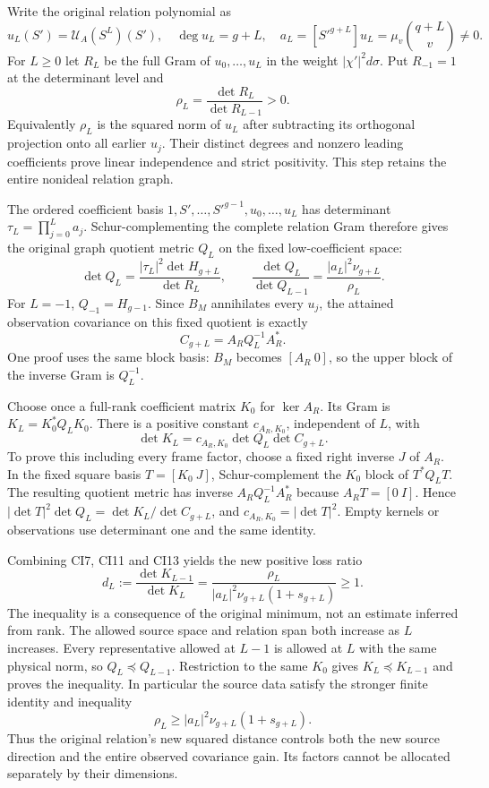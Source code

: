 \documentclass[11pt]{article}
\begin{document}
Write the original relation polynomial as \[
u_L(S')=\mathcal U_A(S^L)(S'),\quad \deg u_L=g+L,
\quad a_L=[S'^{g+L}]u_L=\mu_v\binom{q+L}{v}\ne0.
\tag{CI9}
\] For \(L\ge0\) let \(R_L\) be the full Gram of \(u_0,\ldots,u_L\) in the weight \(|\chi'|^2d\sigma\). Put \(R_{-1}=1\) at the determinant level and \[
\rho_L=\frac{\det R_L}{\det R_{L-1}}>0.
\tag{CI10}
\] Equivalently \(\rho_L\) is the squared norm of \(u_L\) after subtracting its orthogonal projection onto all earlier \(u_j\). Their distinct degrees and nonzero leading coefficients prove linear independence and strict positivity. This step retains the entire nonideal relation graph.

The ordered coefficient basis \(1,S',\ldots,S'^{g-1},u_0,\ldots,u_L\) has determinant \(\tau_L=\prod_{j=0}^La_j\). Schur-complementing the complete relation Gram therefore gives the original graph quotient metric \(Q_L\) on the fixed low-coefficient space: \[
\det Q_L=\frac{|\tau_L|^2\det H_{g+L}}{\det R_L},
\qquad
\frac{\det Q_L}{\det Q_{L-1}}
=\frac{|a_L|^2\nu_{g+L}}{\rho_L}.
\tag{CI11}
\] For \(L=-1\), \(Q_{-1}=H_{g-1}\). Since \(B_M\) annihilates every \(u_j\), the attained observation covariance on this fixed quotient is exactly \[
C_{g+L}=A_RQ_L^{-1}A_R^*.
\tag{CI12}
\] One proof uses the same block basis: \(B_M\) becomes \([A_R\ 0]\), so the upper block of the inverse Gram is \(Q_L^{-1}\).

Choose once a full-rank coefficient matrix \(K_0\) for \(\ker A_R\). Its Gram is \(K_L=K_0^*Q_LK_0\). There is a positive constant \(c_{A_R,K_0}\), independent of \(L\), with \[
\det K_L=c_{A_R,K_0}\det Q_L\det C_{g+L}.
\tag{CI13}
\] To prove this including every frame factor, choose a fixed right inverse \(J\) of \(A_R\). In the fixed square basis \(T=[K_0\ J]\), Schur-complement the \(K_0\) block of \(T^*Q_LT\). The resulting quotient metric has inverse \(A_RQ_L^{-1}A_R^*\) because \(A_RT=[0\ I]\). Hence \(|\det T|^2\det Q_L=\det K_L/\det C_{g+L}\), and \(c_{A_R,K_0}=|\det T|^2\). Empty kernels or observations use determinant one and the same identity.

Combining CI7, CI11 and CI13 yields the new positive loss ratio \[
\boxed{d_L:=\frac{\det K_{L-1}}{\det K_L}
=\frac{\rho_L}{|a_L|^2\nu_{g+L}(1+s_{g+L})}\ge1.}
\tag{CI14}
\] The inequality is a consequence of the original minimum, not an estimate inferred from rank. The allowed source space and relation span both increase as \(L\) increases. Every representative allowed at \(L-1\) is allowed at \(L\) with the same physical norm, so \(Q_L\preceq Q_{L-1}\). Restriction to the same \(K_0\) gives \(K_L\preceq K_{L-1}\) and proves the inequality. In particular the source data satisfy the stronger finite identity and inequality \[
\rho_L\ge |a_L|^2\nu_{g+L}(1+s_{g+L}).
\tag{CI15}
\] Thus the original relation's new squared distance controls both the new source direction and the entire observed covariance gain. Its factors cannot be allocated separately by their dimensions.
\end{document}
